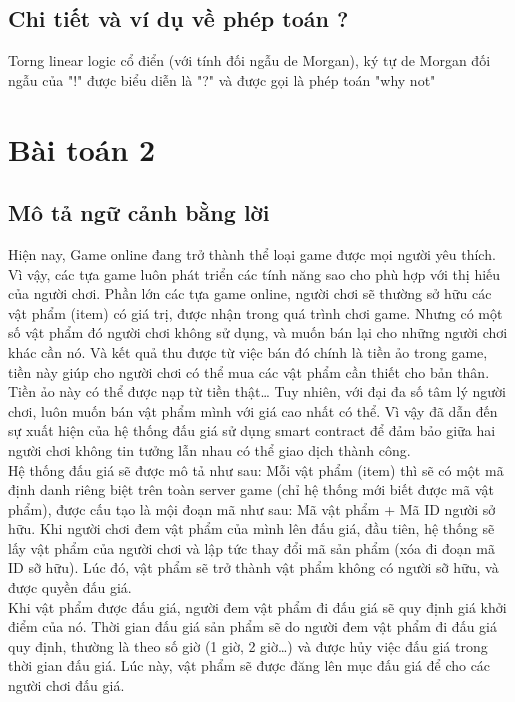 \documentclass[a4paper]{article}
\begin{document}
\subsection{Chi tiết và ví dụ về phép toán ?}
Torng linear logic cổ điển (với tính đối ngẫu de Morgan), ký tự de Morgan đối ngẫu của "!" được biểu diễn là "?" và được gọi là phép toán "why not"

\section{Bài toán 2}
\subsection{Mô tả ngữ cảnh bằng lời}

Hiện nay, Game online đang trở thành thể loại game được mọi người yêu thích. Vì vậy, các tựa game luôn phát triển các tính năng sao cho phù hợp với thị hiếu của người chơi. Phần lớn các tựa game online, người chơi sẽ thường sở hữu các vật phẩm (item) có giá trị, được nhận trong quá trình chơi game. Nhưng có một số vật phẩm đó người chơi không sử dụng, và muốn bán lại cho những người chơi khác cần nó. Và kết quả thu được từ việc bán đó chính là tiền ảo trong game, tiền này giúp cho người chơi có thể mua các vật phẩm cần thiết cho bản thân. Tiền ảo này có thể được nạp từ tiền thật… Tuy nhiên, với đại đa số tâm lý người chơi, luôn muốn bán vật phẩm mình với giá cao nhất có thể. Vì vậy đã dẫn đến sự xuất hiện của hệ thống đấu giá sử dụng smart contract để đảm bảo giữa hai người chơi không tin tưởng lẫn nhau có thể giao dịch thành công.\\

	Hệ thống đấu giá sẽ được mô tả như sau: Mỗi vật phẩm (item) thì sẽ có một mã định danh riêng biệt trên toàn server game (chỉ hệ thống mới biết được mã vật phẩm), được cấu tạo là mội đoạn mã như sau: Mã vật phẩm +  Mã ID người sở hữu. Khi người chơi đem vật phẩm của mình lên đấu giá, đầu tiên, hệ thống sẽ lấy vật phẩm của người chơi và lập tức thay đổi mã sản phẩm (xóa đi đoạn mã ID sỡ hữu). Lúc đó, vật phẩm sẽ trở thành vật phẩm không có người sỡ hữu, và được quyền đấu giá.  \\
	
Khi vật phẩm được đấu giá, người đem vật phẩm đi đấu giá sẽ quy định giá khởi điểm của nó. Thời gian đấu giá sản phẩm sẽ do người đem vật phẩm đi đấu giá quy định, thường là theo số giờ (1 giờ, 2 giờ…) và được hủy việc đấu giá trong thời gian đấu giá. Lúc này, vật phẩm sẽ được đăng lên mục đấu giá để cho các người chơi đấu giá. \\
\end{document}
